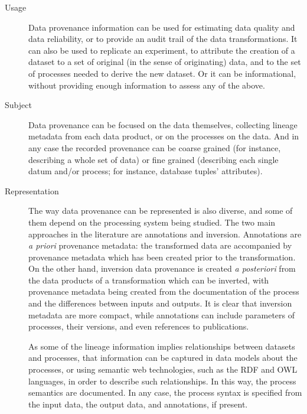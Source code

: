 		\begin{description}
			\item[Usage] Data provenance information can be used
			for estimating data quality and data reliability, or to
			provide an audit trail of the data transformations. It
			can also be used to replicate an experiment, to
			attribute the creation of a dataset to a set of
			original (in the sense of originating) data, and to the
			set of processes needed to derive the new dataset. Or
			it can be informational, without providing enough
			information to assess any of the above.
			
			\item[Subject] Data provenance can be focused on the
			data themselves, collecting lineage metadata from each
			data product, or on the processes on the data. And in
			any case the recorded provenance can be coarse grained
			(for instance, describing a whole set of data) or fine
			grained (describing each single datum and/or process;
			for instance, database tuples' attributes).
			
			\item[Representation] The way data provenance can be
			represented is also diverse, and some of them depend on
			the processing system being studied. The two main
			approaches in the literature are annotations and
			inversion. Annotations are \emph{a priori} provenance
			metadata: the transformed data are accompanied by
			provenance metadata which has been created prior to the
			transformation. On the other hand, inversion data
			provenance is created \emph{a posteriori} from the data
			products of a transformation which can be inverted,
			with provenance metadata being created from the
			documentation of the process and the differences
			between inputs and outputs. It is clear that inversion
			metadata are more compact, while annotations can
			include parameters of processes, their versions, and
			even references to publications.
			
			 As some of the lineage information implies
			relationships between datasets and processes, that
			information can be captured in data models about the
			processes, or using semantic web technologies, such as
			the RDF and OWL languages, in order to describe such
			relationships. In this way, the process semantics are
			documented. In any case, the process syntax is
			specified from the input data, the output data, and
			annotations, if present.
			

\end{description}
